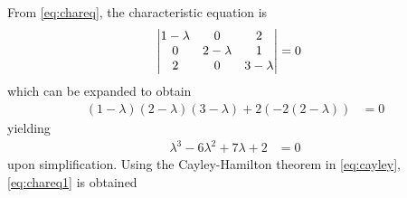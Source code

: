 
From   \eqref{eq:chareq}, the characteristic equation is 
\begin{align}
%
 \mydet{1 -\lambda & 0 & 2 \\ 0 & 2 -\lambda & 1 \\ 2 & 0 & 3-\lambda} &= 0  
\end{align}
which can be expanded to obtain 
\begin{align}
%
 (1-\lambda)(2-\lambda)(3-\lambda) + 2(-2(2-\lambda)) &= 0
\end{align}
yielding
\begin{align}
%
 \lambda^3 - 6\lambda^2 + 7\lambda + 2 &= 0
\end{align}
%
upon simplification. 
Using  the Cayley-Hamilton theorem in \eqref{eq:cayley}, 	\eqref{eq:chareq1} is obtained
%
%
